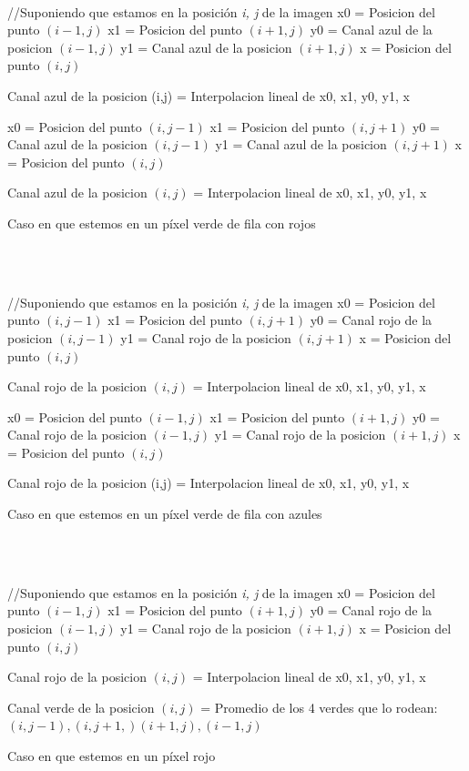 \documentclass[10pt, a4paper]{article}
\begin{document}
\ \\
\begin{algorithm}[H]
//Suponiendo que estamos en la posici\'on \textit{i, j} de la imagen
x0 = Posicion del punto $(i-1,j)$\;
x1 = Posicion del punto $(i+1,j)$\;
y0 = Canal azul de la posicion $(i-1,j)$\;
y1 = Canal azul de la posicion $(i+1,j)$\;
x = Posicion del punto $(i,j)$\;

Canal azul de la posicion (i,j) = Interpolacion lineal de x0, x1, y0, y1, x\;

x0 = Posicion del punto $(i,j-1)$\;
x1 = Posicion del punto $(i,j+1)$\;
y0 = Canal azul de la posicion $(i,j-1)$\;
y1 = Canal azul de la posicion $(i,j+1)$\;
x = Posicion del punto $(i,j)$\;

Canal azul de la posicion $(i,j)$ = Interpolacion lineal de x0, x1, y0, y1, x

\caption{Caso en que estemos en un p\'ixel verde de fila con rojos}
\end{algorithm} 
\ \\
\ \\
\begin{algorithm}[H]
//Suponiendo que estamos en la posici\'on \textit{i, j} de la imagen
x0 = Posicion del punto $(i,j-1)$\;
x1 = Posicion del punto $(i,j+1)$\;
y0 = Canal rojo de la posicion $(i,j-1)$\;
y1 = Canal rojo de la posicion $(i,j+1)$\;
x = Posicion del punto $(i,j)$\;

Canal rojo de la posicion $(i,j)$ = Interpolacion lineal de x0, x1, y0, y1, x\;

x0 = Posicion del punto $(i-1,j)$\;
x1 = Posicion del punto $(i+1,j)$\;
y0 = Canal rojo de la posicion $(i-1,j)$\;
y1 = Canal rojo de la posicion $(i+1,j)$\;
x = Posicion del punto $(i,j)$\;

Canal rojo de la posicion (i,j) = Interpolacion lineal de x0, x1, y0, y1, x\;

\caption{Caso en que estemos en un p\'ixel verde de fila con azules}
\end{algorithm} 
\ \\
\ \\
\begin{algorithm}[H]
//Suponiendo que estamos en la posici\'on \textit{i, j} de la imagen
x0 = Posicion del punto $(i-1,j)$\;
x1 = Posicion del punto $(i+1,j)$\;
y0 = Canal rojo de la posicion $(i-1,j)$\;
y1 = Canal rojo de la posicion $(i+1,j)$\;
x = Posicion del punto $(i,j)$\;

Canal rojo de la posicion $(i,j)$ = Interpolacion lineal de x0, x1, y0, y1, x\;

Canal verde de la posicion $(i,j)$ = Promedio de los 4 verdes que lo rodean: $(i,j-1),(i,j+1,)(i+1,j),(i-1,j)$\;
\caption{Caso en que estemos en un p\'ixel rojo}
\end{algorithm} 
\end{document}
